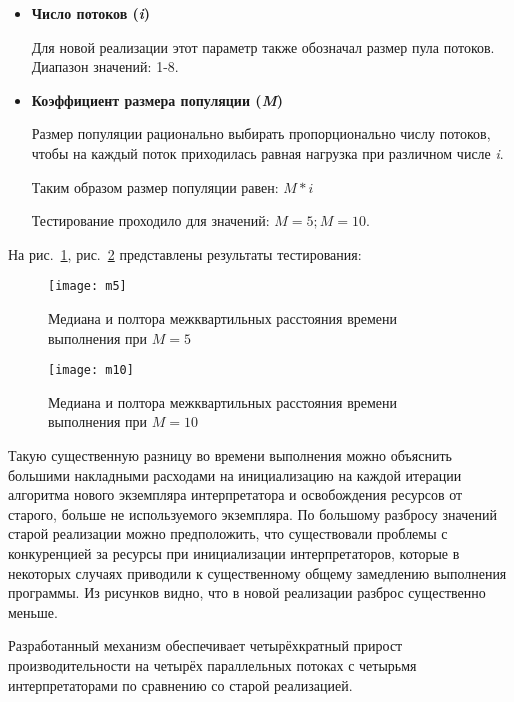 \begin{itemize}
    \item \textbf{Число потоков (\textit{i})}

        Для новой реализации этот параметр также
        обозначал размер пула потоков.
        Диапазон значений: 1-8.
    \item \textbf{Коэффициент размера популяции (\textit{M})}

        Размер популяции рационально выбирать
        пропорционально числу потоков,
        чтобы на каждый поток приходилась
        равная нагрузка при различном
        числе \textit{i}.

        Таким образом размер популяции равен:
        \begin{math}M * i\end{math}

        Тестирование проходило для значений:
        \begin{math}M = 5; M = 10\end{math}.
\end{itemize}

\break
На рис.~\ref{fig:m5}, рис.~\ref{fig:m10} представлены результаты тестирования:

\begin{figure}[!h]
\centering
\texttt{[image: m5]}
\caption{Медиана и полтора межквартильных расстояния
времени выполнения при $M = 5$}
\label{fig:m5}
\end{figure}

\begin{figure}[!h]
\centering
\texttt{[image: m10]}
\caption{Медиана и полтора межквартильных расстояния
времени выполнения при $M = 10$}
\label{fig:m10}
\end{figure}

Такую существенную разницу во времени выполнения
можно объяснить большими накладными расходами
на инициализацию на каждой итерации алгоритма
нового экземпляра интерпретатора
и освобождения ресурсов от старого,
больше не используемого экземпляра.
По большому разбросу значений
старой реализации можно предположить,
что существовали проблемы с конкуренцией
за ресурсы при инициализации интерпретаторов,
которые в некоторых случаях приводили к
существенному общему замедлению выполнения программы.
Из рисунков видно,
что в новой реализации разброс существенно меньше.

Разработанный механизм обеспечивает
четырёхкратный прирост производительности
на четырёх параллельных потоках
с четырьмя интерпретаторами по
сравнению со старой реализацией.

